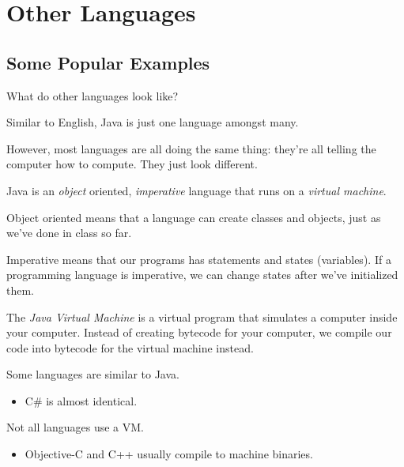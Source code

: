 

\section{Other Languages}
\subsection{Some Popular Examples}
\begin{frame}{What do other languages look like?}
\begin{itemize}{\small
\item Similar to English, Java is just one language amongst many. \pause
\item However, most languages are all doing the same thing: they're all telling the computer how to compute. They just look different. \pause
\item Java is an \emph{object} oriented, \emph{imperative} language that runs on a \emph{virtual machine}.
\item Object oriented means that a language can create classes and objects, just as we've done in class so far.\pause
\item Imperative means that our programs has statements and states (variables). If a programming language is imperative, we can change states after we've initialized them.\pause
\item The \emph{Java Virtual Machine} is a virtual program that simulates a computer inside your computer. Instead of creating bytecode for your computer, we compile our code into bytecode for the virtual machine instead.
}\end{itemize}
\end{frame}

\begin{frame}[fragile]{Some languages are similar to Java.}
\begin{itemize}
\item C\# is almost identical.
\end{itemize}
\begin{semiverbatim}\end{semiverbatim}
\end{frame}


\begin{frame}[fragile]{Not all languages use a VM.}
\begin{itemize}
\item Objective-C and C++ usually compile to machine binaries.
\end{itemize}
\begin{semiverbatim}\end{semiverbatim}
\end{frame}


